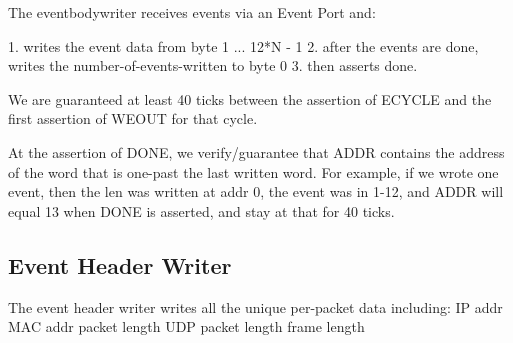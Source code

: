 The eventbodywriter receives events via an Event Port and: 

1. writes the event data from byte 1 ... 12*N - 1
2. after the events are done, writes the number-of-events-written to byte 0
3. then asserts done. 

We are guaranteed at least 40 ticks between the assertion of ECYCLE
and the first assertion of WEOUT for that cycle. 

At the assertion of DONE, we verify/guarantee that ADDR contains the
address of the word that is one-past the last written word. For
example, if we wrote one event, then the len was written at addr 0,
the event was in 1-12, and ADDR will equal 13 when DONE is asserted,
and stay at that for 40 ticks.

\subsection{Event Header Writer}
The event header writer writes all the unique per-packet data including: 
IP addr
MAC addr
packet length
UDP packet length
frame length
